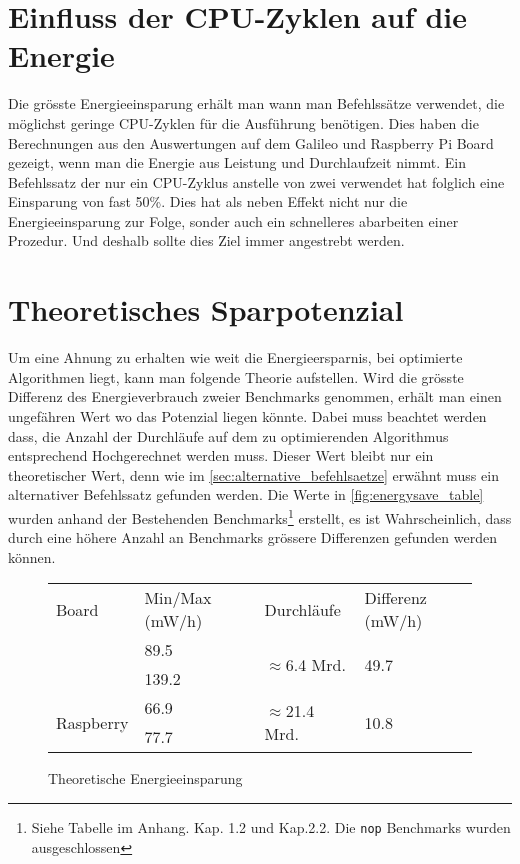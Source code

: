\section{Einfluss der CPU-Zyklen auf die Energie}
Die grösste Energieeinsparung erhält man wann man Befehlssätze verwendet, die möglichst geringe CPU-Zyklen für die Ausführung benötigen. Dies haben die Berechnungen aus den Auswertungen auf dem Galileo und Raspberry Pi Board gezeigt, wenn man die Energie aus Leistung und Durchlaufzeit nimmt. Ein Befehlssatz der nur ein CPU-Zyklus anstelle von zwei verwendet hat folglich eine Einsparung von fast 50\%. Dies hat als neben Effekt nicht nur die Energieeinsparung zur Folge, sonder auch ein schnelleres abarbeiten einer Prozedur. Und deshalb sollte dies Ziel immer angestrebt werden.

\section{Theoretisches Sparpotenzial}
Um eine Ahnung zu erhalten wie weit die Energieersparnis, bei optimierte Algorithmen liegt, kann man folgende Theorie aufstellen. Wird die grösste Differenz des Energieverbrauch zweier Benchmarks genommen, erhält man einen ungefähren Wert wo das Potenzial liegen könnte. Dabei muss beachtet werden dass, die Anzahl der Durchläufe auf dem zu optimierenden Algorithmus entsprechend Hochgerechnet werden muss. Dieser Wert bleibt nur ein theoretischer Wert, denn wie im \autoref{sec:alternative_befehlsaetze} erwähnt muss ein alternativer Befehlssatz gefunden werden. Die Werte in \autoref{fig:energysave_table} wurden anhand der Bestehenden Benchmarks\footnote{Siehe Tabelle im Anhang. Kap. 1.2 und Kap.2.2. Die \texttt{nop} Benchmarks wurden ausgeschlossen} erstellt, es ist Wahrscheinlich, dass durch eine höhere Anzahl an Benchmarks grössere Differenzen gefunden werden können.


\begin{figure}[H]
\center
\begin{tabular}{ |l|l|l|l| }
\hline
Board & Min/Max (mW/h) & Durchläufe & Differenz (mW/h) \\ \hhline{|=|=|=|=|}
\multirow{2}{*}{Galileo} & 89.5 & \multirow{2}{*}{$\approx$6.4 Mrd.} & \multirow{2}{*}{49.7} \\ 
 & 139.2 & &  \\ \hline
\multirow{2}{*}{Raspberry} & 66.9 & \multirow{2}{*}{$\approx$21.4 Mrd.} & \multirow{2}{*}{10.8} \\ 
 & 77.7 & &  \\
\hline
\end{tabular}
\caption{Theoretische Energieeinsparung}
\label{fig:energysave_table}
\end{figure}


